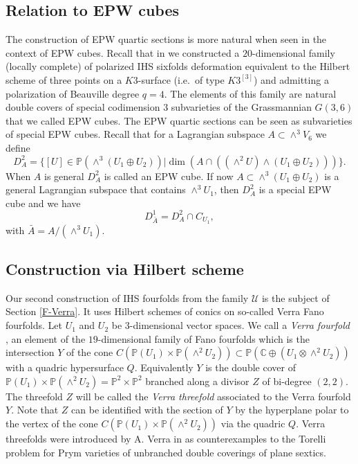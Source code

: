 \documentclass[a4paper,11pt]{amsart}
\theoremstyle{definition}
\numberwithin{equation}{section}
\numberwithin{equation}{section} \theoremstyle{definition}
\begin{document}
 
\subsection{Relation to EPW cubes} 
The construction of EPW quartic sections is more natural when seen in the context  of EPW cubes. Recall that in \cite{EPWcubes} we constructed a $20$-dimensional family (locally complete) of polarized IHS sixfolds deformation equivalent to the Hilbert scheme of three points on a $K3$-surface (i.e.~of type $K3^{[3]}$) and admitting a  polarization of Beauville degree $q=4$. The elements of this family are natural double covers of special codimension $3$ subvarieties of the Grassmannian $G(3,6)$ that we called EPW cubes. The EPW quartic sections can be seen as subvarieties of special 
EPW cubes.
Recall that for a Lagrangian subspace $A\subset \wedge^3 V_6$ we define 
$$D^2_A=\{[U]\in {{\mathbb{P}}}(\wedge^3(U_1\oplus U_2))| \dim (A\cap ((\wedge^2 U) \wedge (U_1\oplus U_2)))\}.$$
When $A$ is general $D^2_A$ is called an EPW cube.
If now $A\subset \wedge^3(U_1\oplus U_2) $ is a general Lagrangian subspace that contains $\wedge^3 U_1$, 
then $D^2_A $ 
is a special 
EPW cube and we have
$$D^1_{\bar{A}}=D^2_A \cap C_{U_1},$$
with $\bar{A}=A/(\wedge^3 U_1)$.

 \subsection{Construction via Hilbert scheme}
Our second construction of IHS fourfolds from the family $\mathcal{U}$ is the subject of Section \ref{F-Verra}. It uses Hilbert schemes of conics on so-called Verra Fano fourfolds.
Let $U_1$ and $U_2$ be $3$-dimensional vector spaces.
We call a \emph{Verra fourfold} \cite{Vera}, \cite{Iliev} an element of the $19$-dimensional family of Fano fourfolds which is the intersection $Y$ of the cone $C({{\mathbb{P}}}( U_1)\times {{\mathbb{P}}}(\wedge^2 U_2))\subset {{\mathbb{P}}}({{\mathbb{C}  }}\oplus ( U_1 \otimes \wedge^2 U_2))$ with a quadric hypersurface $Q$. 
Equivalently $Y$ is the double cover of ${{\mathbb{P}}}(U_1)\times {{\mathbb{P}}}(\wedge^2 U_2)={{\mathbb{P}}}^2\times {{\mathbb{P}}}^2$ branched along a divisor $Z$ of bi-degree $(2,2)$. The threefold $Z$ will be called the \emph{Verra threefold} associated to the Verra fourfold $Y$.  Note that $Z$ can be identified with the section of $Y$ by the hyperplane polar to the vertex of the cone $C({{\mathbb{P}}}( U_1)\times {{\mathbb{P}}}(\wedge^2 U_2))$ via the quadric $Q$.
Verra threefolds were introduced by  A. Verra in \cite{Vera} as counterexamples to the Torelli problem for Prym varieties of unbranched double coverings  of plane sextics.
\end{document}
